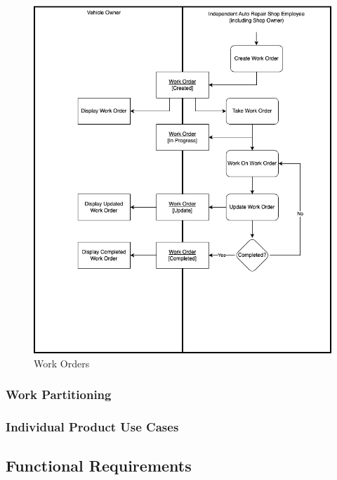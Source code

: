 \documentclass[12pt]{article}
\begin{document}
\FloatBarrier
\begin{figure}[!hbp]
	\centering
	\includegraphics[width=\linewidth/2]{./diagrams/WorkOrder.png}
	\caption{Work Orders}
\end{figure}
\FloatBarrier

\subsubsection{Work Partitioning}

\subsubsection{Individual Product Use Cases}

\subsection{Functional Requirements}
\end{document}
